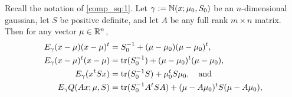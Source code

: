 \documentclass[12pt,leqno]{article}
\begin{document}
  \begin{Lem}\label{exp_log}
    Recall the notation of \eqref{comp_sq:1}. Let $\gamma := {\mathbb N}(x;\mu_0,S_0)$ be an $n$-dimensional gaussian,  let $S$ be
    positive definite, and let $A$ be any
    full rank $m\times{n}$ matrix. Then for any vector $\mu\in{\mathbb R}^n$, 
    \begin{align}
      E_{\gamma}(x-\mu)(x-\mu)^t &= S_0^{-1} + (\mu-\mu_0)(\mu-\mu_0)^t, \label{E_xx^t}\\
      E_{\gamma}(x-\mu)^t(x - \mu) &=  \text{\rm tr}(S_0^{-1}) + (\mu-\mu_0)^t(\mu-\mu_0), \label{E_x^tx}\\
      E_{\gamma}(x^tSx) &= \text{\rm tr}(S_0^{-1}S) + \mu_0^tS\mu_0, \quad\text{and} \label{E_x^tSx} \\
        E_{\gamma}{Q}(Ax;\mu,S) &=  \text{\rm tr}(S_0^{-1}A^tSA) + (\mu-A\mu_0)^tS(\mu-A\mu_0), \label{E_Q}
    \end{align}
  \end{Lem}
\end{document}
